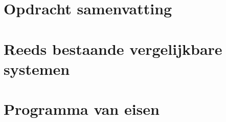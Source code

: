 \section{Opdracht samenvatting}
\section{Reeds bestaande vergelijkbare systemen}
    
\section{Programma van eisen} %